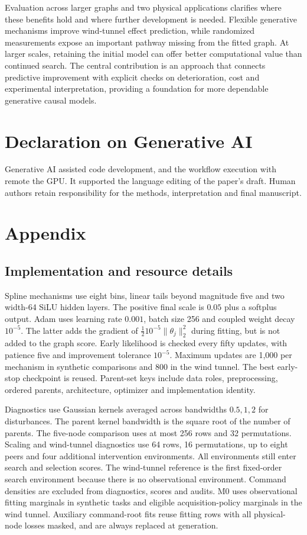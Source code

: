 \documentclass{svproc}
\begin{document}
Evaluation across larger graphs and two physical applications clarifies where
these benefits hold and where further development is needed. Flexible
generative mechanisms improve wind-tunnel effect prediction, while randomized
measurements expose an important pathway missing from the fitted graph.
At larger scales, retaining the initial model can offer better computational
value than continued search. The central contribution is an approach that
connects predictive improvement with explicit checks on deterioration, cost
and experimental interpretation, providing a foundation for more dependable
generative causal models.

\section*{Declaration on Generative AI}
Generative AI assisted code development, and the workflow execution with remote the GPU.
It supported the language editing of the paper's draft.
Human authors retain responsibility for
the methods, interpretation and final manuscript.
\label{maintext-end}
\clearpage




\section*{Appendix}\label{appendix-start}

\subsection*{Implementation and resource details}
Spline mechanisms use eight bins, linear tails beyond magnitude five and two
width-64 SiLU hidden layers. The positive final scale is $0.05$ plus a softplus
output. Adam uses learning rate $0.001$, batch size 256 and coupled weight decay
$10^{-5}$. The latter adds the gradient of
$\tfrac12 10^{-5}\|\theta_j\|_2^2$ during fitting, but is not added to the graph
score. Early likelihood is checked every fifty updates, with patience five and
improvement tolerance $10^{-5}$. Maximum updates are 1,000 per mechanism in
synthetic comparisons and 800 in the wind tunnel. The best early-stop checkpoint
is reused. Parent-set keys include data roles, preprocessing, ordered parents,
architecture, optimizer and implementation identity.

Diagnostics use Gaussian kernels averaged across bandwidths $0.5,1,2$ for
disturbances. The parent kernel bandwidth is the square root of the number of
parents. The five-node comparison uses at most 256 rows and 32 permutations.
Scaling and wind-tunnel diagnostics use 64 rows, 16 permutations, up to eight
peers and four additional intervention environments. All environments still
enter search and selection scores. The wind-tunnel reference is the first
fixed-order search environment because there is no observational environment.
Command densities are excluded from diagnostics, scores and audits. M0 uses
observational fitting marginals in synthetic tasks and eligible acquisition-policy
marginals in the wind tunnel. Auxiliary command-root fits reuse fitting rows
with all physical-node losses masked, and are always replaced at generation.
\end{document}
